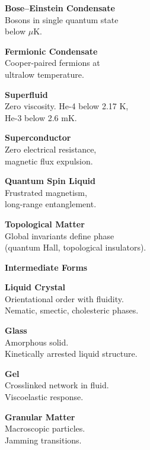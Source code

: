 \begin{tcolorbox}
\begin{multicols}{2}
\textbf{Bose–Einstein Condensate}\\
{\footnotesize Bosons in single quantum state\\below $\mu$K.}\vspace{6pt}

\textbf{Fermionic Condensate}\\
{\footnotesize Cooper-paired fermions at\\ultralow temperature.}\vspace{6pt}

\textbf{Superfluid}\\
{\footnotesize Zero viscosity. He-4 below 2.17 K,\\He-3 below 2.6 mK.}\vspace{6pt}

\textbf{Superconductor}\\
{\footnotesize Zero electrical resistance,\\magnetic flux expulsion.}\vspace{6pt}

\textbf{Quantum Spin Liquid}\\
{\footnotesize Frustrated magnetism,\\long-range entanglement.}\vspace{6pt}

\textbf{Topological Matter}\\
{\footnotesize Global invariants define phase\\(quantum Hall, topological insulators).}

\columnbreak

\colorbox{blue!15}{\textbf{\large Intermediate Forms}}\vspace{3pt}

\textbf{Liquid Crystal}\\
{\footnotesize Orientational order with fluidity.\\Nematic, smectic, cholesteric phases.}\vspace{6pt}

\textbf{Glass}\\
{\footnotesize Amorphous solid.\\Kinetically arrested liquid structure.}\vspace{6pt}

\textbf{Gel}\\
{\footnotesize Crosslinked network in fluid.\\Viscoelastic response.}\vspace{6pt}

\textbf{Granular Matter}\\
{\footnotesize Macroscopic particles.\\Jamming transitions.}\vspace{12pt}


\end{multicols}
\end{tcolorbox}
